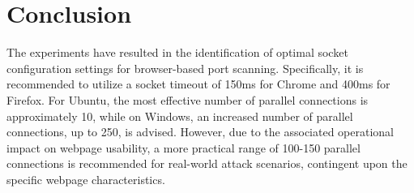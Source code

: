 


\section{Conclusion}

The experiments have resulted in the identification of optimal socket configuration settings for browser-based port scanning. Specifically, it is recommended to utilize a socket timeout of 150ms for Chrome and 400ms for Firefox. For Ubuntu, the most effective number of parallel connections is approximately 10, while on Windows, an increased number of parallel connections, up to 250, is advised. However, due to the associated operational impact on webpage usability, a more practical range of 100-150 parallel connections is recommended for real-world attack scenarios, contingent upon the specific webpage characteristics. 

